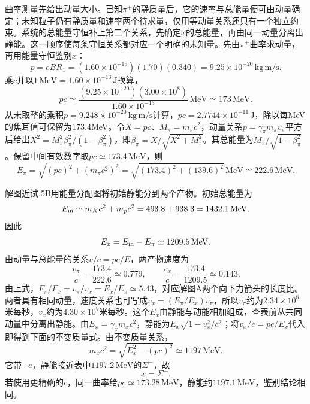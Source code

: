 \documentclass[UTF8,fontset=fandol,a4paper,11pt]{ctexart}
\newcommand{\figcaption}[1]{\par\vspace{2pt}{\small\color{muted}#1}\par}
\begin{document}
曲率测量先给出动量大小。已知$\pi^+$的静质量后，它的速率与总能量便可由动量确定；未知粒子仍有静质量和速率两个待求量，仅用等动量关系还只有一个独立约束。系统的总能量守恒补上第二个关系，先确定$x$的总能量，再由同一动量分离出静能。这一顺序使每条守恒关系都对应一个明确的未知量。先由$\pi^+$曲率求动量，再用能量守恒鉴别$x$：
\[
p=eBR_1=(1.60\times10^{-19})(1.70)(0.340)
=9.25\times10^{-20}\,\mathrm{kg\,m/s}.
\]
乘$c$并以$1\,\mathrm{MeV}=1.60\times10^{-13}\,\mathrm J$换算，
\[
pc\simeq\frac{(9.25\times10^{-20})(3.00\times10^8)}
{1.60\times10^{-13}}\,\mathrm{MeV}
\simeq173\,\mathrm{MeV}.
\]
从未取整的乘积$p=9.248\times10^{-20}\,\mathrm{kg\,m/s}$计算，$pc=2.7744\times10^{-11}\,\mathrm J$，除以每MeV的焦耳值可保留为$173.4$MeV。令$X=pc$、$M_\pi=m_\pi c^2$，动量关系$p=\gamma_\pi m_\pi v_\pi$平方后给出$X^2=M_\pi^2\beta_\pi^2/(1-\beta_\pi^2)$，即$\beta_\pi=X/\sqrt{X^2+M_\pi^2}$。其总能量为$M_\pi/\sqrt{1-\beta_\pi^2}$。保留中间有效数字取$pc\simeq173.4\,\mathrm{MeV}$，则
\[
E_\pi=\sqrt{(pc)^2+(m_\pi c^2)^2}
=\sqrt{(173.4)^2+(139.6)^2}\,\mathrm{MeV}
\simeq222.6\,\mathrm{MeV}.
\]
\begin{center}\begin{minipage}{.98\linewidth}\centering
{}
\figcaption{解图近试.5B\quad 能量分段示意；总能量与静能通过共同动量联系。}
\end{minipage}\end{center}
解图近试.5B用能量分配图将初始静能分到两个产物。初始总能量为
\[
E_{\rm in}\simeq m_Kc^2+m_pc^2=493.8+938.3=1432.1\,\mathrm{MeV}.
\]
因此
\[
E_x=E_{\rm in}-E_\pi\simeq1209.5\,\mathrm{MeV}.
\]
由动量与总能量的关系$v/c=pc/E$，两产物速度为
\[
\frac{v_\pi}{c}=\frac{173.4}{222.6}\simeq0.779,\qquad
\frac{v_x}{c}=\frac{173.4}{1209.5}\simeq0.143.
\]
由上式，$F_\pi/F_x=v_\pi/v_x=E_x/E_\pi\simeq5.43$，对应解图A两个向下力箭头的长度比。两者具有相同动量，速度关系也可写成$v_x=(E_\pi/E_x)v_\pi$，所以$v_\pi$约为$2.34\times10^8$米每秒，$v_x$约为$4.30\times10^7$米每秒。这个$E_x$由静能与动能相加组成，查表前从共同动量中分离出静能。由$E_x=\gamma_xm_xc^2$，静能为$E_x\sqrt{1-v_x^2/c^2}$；将$v_x/c=pc/E_x$代入即得到下面的不变质量式。由不变质量关系，
\[
\boxed{m_xc^2=\sqrt{E_x^2-(pc)^2}
\simeq1197\,\mathrm{MeV}}.
\]
它带$-e$，静能接近表中$1197.2\,\mathrm{MeV}$的$\Sigma^-$，故
\[
\boxed{x=\Sigma^-}.
\]
若使用更精确的$c$，同一曲率给$pc\simeq173.28\,\mathrm{MeV}$，静能约$1197.1\,\mathrm{MeV}$，鉴别结论相同。
\end{document}
